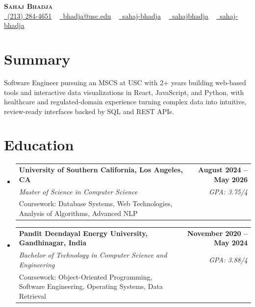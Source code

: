 \documentclass[letterpaper,10pt]{article}
\makeatletter
\newcommand{\resumeEduSubheading}[5]{\vspace{-1pt}\item\begin{tabular*}{1.0\textwidth}[t]{l@{\extracolsep{\fill}}r}\textbf{#1} & \textbf{\small #2} \\\textit{\small #3} & \textit{\small #4} \\\small #5 & \\\end{tabular*}\vspace{-4pt}}
\newcommand{\resumeSubHeadingListStart}{\begin{itemize}[leftmargin=0.0in, label={}]}
\newcommand{\resumeSubHeadingListEnd}{\end{itemize}}
\makeatother
\begin{document}
\begin{center}
{\Huge \scshape \textbf{Sahaj Bhadja}} \\ \vspace{1pt}
\small \href{tel:(213) 284-4651}{\faPhone\ \underline{(213) 284-4651}} ~ \href{mailto: bhadja@usc.edu}{\raisebox{-0.2\height}\faEnvelope\ \underline{bhadja@usc.edu}} ~
\href{https://www.linkedin.com/in/sahaj-bhadja/}{\raisebox{-0.2\height}\faLinkedin\ \underline{sahaj-bhadja}} ~ \href{https://github.com/SAHAJ-BHADJA}{\raisebox{-0.2\height}\faGithub\ \underline{sahajbhadja}} ~
\href{https://sahaj-bhadja.vercel.app/}{\raisebox{-0.2\height}\faGlobe\ \underline{sahaj-bhadja}}
\end{center}
\vspace{-16pt}
\section{Summary}
\begin{itemize}[leftmargin=0.15in, label={}]
\small{\item{Software Engineer pursuing an MSCS at USC with 2+ years building web-based tools and interactive data visualizations in React, JavaScript, and Python, with healthcare and regulated-domain experience turning complex data into intuitive, review-ready interfaces backed by SQL and REST APIs.}}
\end{itemize}
\vspace{-6pt}
\section{Education}
\resumeSubHeadingListStart
\resumeEduSubheading{University of Southern California, Los Angeles, CA}{August 2024 -- May 2026}{Master of Science in Computer Science}{GPA: 3.75/4}{Coursework: Database Systems, Web Technologies, Analysis of Algorithms, Advanced NLP}
\vspace{-9pt}
\resumeEduSubheading{Pandit Deendayal Energy University, Gandhinagar, India}{November 2020 -- May 2024}{Bachelor of Technology in Computer Science and Engineering}{GPA: 3.88/4}{Coursework: Object-Oriented Programming, Software Engineering, Operating Systems, Data Retrieval}
\resumeSubHeadingListEnd
\vspace{-6pt}
\end{document}
